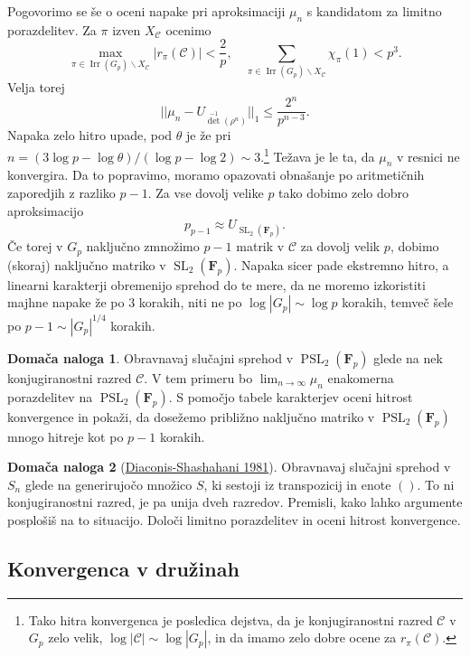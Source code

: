 \documentclass[11pt]{book}
\def\conclass{\mathcal{C}}
\def\FF{\mathbf{F}}
\DeclareMathOperator\Irr{Irr}
\DeclareMathOperator\SL{SL}
\DeclareMathOperator\PSL{PSL}
\theoremstyle{definition}
\theoremstyle{zgled}
\theoremstyle{odprtproblem}
\theoremstyle{domacanaloga}
\newtheorem*{domacanaloga}{Domača naloga}
\theoremstyle{izrek}
\begin{document}
Pogovorimo se še o oceni napake pri aproksimaciji $\mu_n$ s kandidatom za limitno porazdelitev. Za $\pi$ izven $X_{\conclass}$ ocenimo
\[
    \max_{\pi \in \Irr(G_p) \backslash X_{\conclass}} |r_{\pi}(\conclass)| < \frac{2}{p}, \quad
    \sum_{\pi \in \Irr(G_p) \backslash X_{\conclass}} \chi_{\pi}(1)
    < p^3.
\]
Velja torej
\[
    || \mu_n - U_{\det^{-1}(\rho^n)} ||_1
    \leq
    \frac{2^n}{p^{n-3}}.
\]
Napaka zelo hitro upade, pod $\theta$ je že pri $n = (3 \log p - \log \theta) / (\log p - \log 2) \sim 3$.\footnote{Tako hitra konvergenca je posledica dejstva, da je konjugiranostni razred $\conclass$ v $G_p$ zelo velik, $\log |\conclass| \sim \log |G_p|$, in da imamo zelo dobre ocene za $r_{\pi}(\conclass)$.} Težava je le ta, da $\mu_n$ v resnici ne konvergira. Da to popravimo, moramo opazovati obnašanje po aritmetičnih zaporedjih z razliko $p-1$. Za vse dovolj velike $p$ tako dobimo zelo dobro aproksimacijo
\[
    p_{p-1} \approx U_{\SL_2(\FF_p)}.
\]
Če torej v $G_p$ naključno zmnožimo $p-1$ matrik v $\conclass$ za dovolj velik $p$, dobimo (skoraj) naključno matriko v $\SL_2(\FF_p)$. Napaka sicer pade ekstremno hitro, a linearni karakterji obremenijo sprehod do te mere, da ne moremo izkoristiti majhne napake že po $3$ korakih, niti ne po $\log |G_p| \sim \log p$ korakih, temveč šele po $p-1 \sim |G_p|^{1/4}$ korakih. 

\begin{domacanaloga}
Obravnavaj slučajni sprehod v $\PSL_2(\FF_p)$ glede na nek konjugiranostni razred $\conclass$. V tem primeru bo $\lim_{n \to \infty} \mu_n$ enakomerna porazdelitev na $\PSL_2(\FF_p)$. S pomočjo tabele karakterjev oceni hitrost konvergence in pokaži, da dosežemo približno naključno matriko v $\PSL_2(\FF_p)$ mnogo hitreje kot po $p-1$ korakih.
\end{domacanaloga}

\begin{domacanaloga}[\href{https://link.springer.com/article/10.1007/BF00535487}{Diaconis-Shashahani 1981}]
Obravnavaj slučajni sprehod v $S_n$ glede na generirujočo množico $S$, ki sestoji iz transpozicij in enote $()$. To ni konjugiranostni razred, je pa unija dveh razredov. Premisli, kako lahko argumente posplošiš na to situacijo. Določi limitno porazdelitev in oceni hitrost konvergence.
\end{domacanaloga}

\subsection{Konvergenca v družinah}
\end{document}
